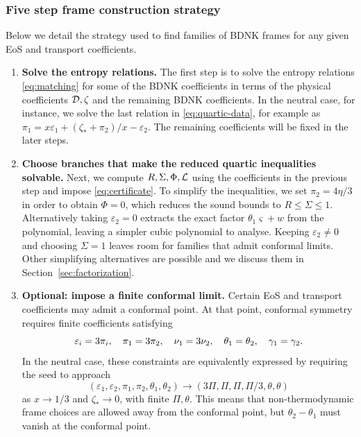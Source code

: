 \subsubsection{Five step frame construction strategy} \label{sec:constructionstrategy}
Below we detail the strategy used to find families of BDNK frames for
any given EoS and transport coefficients.
\begin{enumerate}
\item \textbf{Solve the entropy relations.}
The first step is to solve the entropy relations \eqref{eq:matching} for some of the BDNK coefficients in terms of the physical coefficients $\mathcal D, \zeta$ and the remaining BDNK coefficients.
In the neutral case, for instance, we solve the last relation in
\eqref{eq:quartic-data}, for example as
$\pi_1=x\varepsilon_1+(\zeta_*+\pi_2)/x-\varepsilon_2$. The remaining coefficients will be fixed in the later steps.

\item \textbf{Choose branches that make the reduced quartic inequalities solvable.}
Next, we compute $R,\Sigma,\Phi,\mathcal L$ using the coefficients in the previous step and impose
\eqref{eq:certificate}. To simplify the inequalities, we set $\pi_2=4\eta/3$ in order to obtain $\Phi=0$, which reduces the sound bounds to
$R\leq\Sigma\leq1$. Alternatively taking $\varepsilon_2=0$ extracts the exact factor
$\theta_1\varsigma+w$ from the polynomial, leaving a simpler cubic polynomial to analyse. Keeping $\varepsilon_2\ne0$
and choosing $\Sigma=1$ leaves room for families that admit conformal limits. Other simplifying alternatives are possible and we discuss them in Section~\ref{sec:factorization}.

\item \textbf{Optional: impose a finite conformal limit.}
Certain EoS and transport coefficients may admit a conformal point. At
that point, conformal symmetry requires finite coefficients satisfying
\cite{Kovtun2019,HoultKovtun}
\begin{equation}\label{eq:conformal}
 \varepsilon_i=3\pi_i,\quad \pi_1=3\pi_2,\quad \nu_1=3\nu_2,
 \quad\theta_1=\theta_2,\quad\gamma_1=\gamma_2.
\end{equation}
In the neutral case, these constraints are equivalently expressed by requiring the seed
to approach 
\[
 (\varepsilon_1,\varepsilon_2,\pi_1,\pi_2,\theta_1,\theta_2)
 \longrightarrow(3\Pi,\Pi,\Pi,\Pi/3,\theta,\theta)
\]
as $x\to1/3$ and $\zeta_*\to0$, with finite $\Pi,\theta$. This means that non-thermodynamic frame choices are allowed away
from the conformal point, but $\theta_2-\theta_1$ must vanish at the conformal point. 


\end{enumerate}
